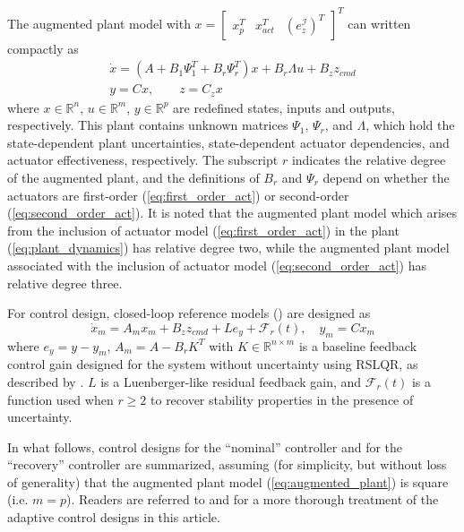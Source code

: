 \documentclass[english]{ifacconf}
\begin{document}
The augmented plant model with $x = \begin{bmatrix} x_p^T & x_{act}^T & (e_z^{\mathcal{I}})^T\end{bmatrix}^T$ can written compactly as
\begin{equation}
\begin{array}{c}
\dot{x}= \left(A+B_{1}\Psi_{1}^{T}+B_{r}\Psi_{r}^{T}\right) x+B_{r}\Lambda u+B_{z}z_{cmd}\\
y=Cx,\qquad z=C_{z}x
\end{array} \label{eq:augmented_plant}
\end{equation}
where $x\in\mathbb{R}^{n}$, $u\in\mathbb{R}^{m}$, $y\in\mathbb{R}^{p}$ are redefined states, inputs and outputs, respectively. 
This plant contains unknown matrices $\Psi_1$, $\Psi_r$, and $\Lambda$, which hold the state-dependent plant uncertainties, state-dependent actuator dependencies, and actuator effectiveness, respectively. The subscript $r$ indicates the relative degree of the augmented plant, and the definitions of $B_r$ and $\Psi_r$ depend on whether the actuators are first-order (\ref{eq:first_order_act}) or second-order (\ref{eq:second_order_act}). It is noted that the augmented plant model which arises from the inclusion of actuator model (\ref{eq:first_order_act}) in the plant (\ref{eq:plant_dynamics}) has relative degree two, while the augmented plant model associated with the inclusion of actuator model (\ref{eq:second_order_act}) has relative degree three. 

For control design, closed-loop reference models (\cite{gibson2013adaptive}) are designed as
\begin{equation}
\dot{x}_m = A_m x_m + B_z z_{cmd} + L e_y + \mathcal{F}_r(t), \quad y_m = C x_m
\end{equation}
where $e_y = y - y_m$, $A_m = A - B_r K^T$ with $K\in\mathbb{R}^{n\times m}$ is a baseline feedback control gain designed for the system without uncertainty using RSLQR, as described by \cite{lavretsky2013robust}. $L$ is a Luenberger-like residual feedback gain, and $\mathcal{F}_r(t)$ is a function used when $r \geq 2$ to recover stability properties in the presence of uncertainty. 

In what follows, control designs for the ``nominal'' controller and for the ``recovery'' controller are summarized, assuming (for simplicity, but without loss of generality) that the augmented plant model (\ref{eq:augmented_plant}) is square (i.e. $m = p$). Readers are referred to \cite{qu2016phd} and \cite{qu2016adaptive} for a more thorough treatment of the adaptive control designs in this article. 
 
\end{document}
